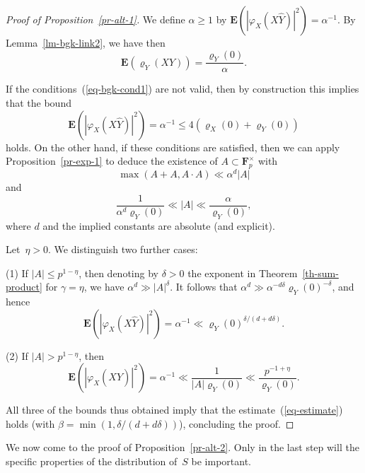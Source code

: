 \documentclass[12pt]{amsart}
\renewcommand{\leq}{\leqslant}
\renewcommand{\geq}{\geqslant}
\numberwithin{equation}{section}
\newcommand{\Ff}{\mathbf{F}}
\newcommand{\expect}{\mathbf{E}}
\renewcommand{\rho}{\varrho}
\theoremstyle{plain}
\theoremstyle{remark}
\theoremstyle{definition}
\renewcommand{\geq}{\geqslant}
\renewcommand{\leq}{\leqslant}
\begin{document}
\begin{proof}[Proof of Proposition~\ref{pr-alt-1}]
  We define $\alpha\geq 1$ by
  $\expect(|\varphi_X(X\widehat{Y})|^2)=\alpha^{-1}$. 
  By Lemma~\ref{lm-bgk-link2}, we have then
  $$
  \expect(\rho_Y(XY))=\frac{\rho_Y(0)}{\alpha}.
  $$

  If the conditions~(\ref{eq-bgk-cond1}) are not valid, then by
  construction this implies that the bound
  $$
  \expect(|\varphi_X(X\widehat{Y})|^2)=\alpha^{-1}\leq
  4(\rho_X(0)+\rho_Y(0))
  $$
  holds.  On the other hand, if these conditions are satisfied, then we
  can apply Proposition~\ref{pr-exp-1} to deduce the existence of
  $A\subset \Ff_p^{\times}$ with
  $$
  \max(A+A,A\cdot A)\ll \alpha^d|A|
  $$
  and
  $$
  \frac{1}{\alpha^d\rho_Y(0)}\ll |A|\ll \frac{\alpha}{\rho_Y(0)},
  $$
  where $d$ and the implied constants are absolute (and explicit).

  Let~$\eta>0$. We distinguish two further cases:

  (1) If $|A|\leq p^{1-\eta}$, then denoting by $\delta>0$ the exponent
  in Theorem~\ref{th-sum-product} for $\gamma=\eta$, we have
  $\alpha^d\gg |A|^{\delta}$. It follows that
  $\alpha^d\gg \alpha^{-d\delta}\rho_Y(0)^{-\delta}$, and hence
  $$
  \expect(|\varphi_X(X\widehat{Y})|^2)=\alpha^{-1}\ll
  \rho_Y(0)^{\delta/(d+d\delta)}.
  $$

  (2) If $|A|>p^{1-\eta}$, then
  $$
  \expect(|\varphi_X(X\widehat{Y})|^2)=\alpha^{-1}\ll
  \frac{1}{|A|\rho_Y(0)}\ll \frac{p^{-1+\eta}}{\rho_Y(0)}.
  $$

  All three of the bounds thus obtained imply that the
  estimate~(\ref{eq-estimate}) holds (with
  $\beta=\min(1,\delta/(d+d\delta))$), concluding the proof.
\end{proof}

We now come to the proof of Proposition~\ref{pr-alt-2}. Only in the last
step will the specific properties of the distribution of~$S$ be
important.
\end{document}
